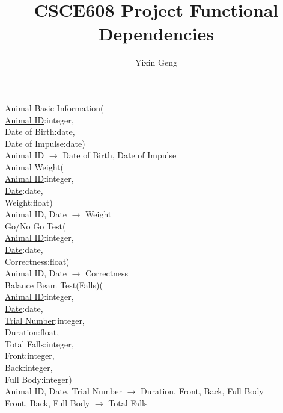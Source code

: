 \documentclass[12pt]{article}
\title{CSCE608 Project Functional Dependencies}
\author{Yixin Geng}
\date{}
\begin{document}
	\maketitle
	Animal Basic Information(\\
	\indent\indent \underline{Animal ID}:integer,\\
	\indent\indent Date of Birth:date,\\
	\indent\indent Date of Impulse:date)\\
	\indent Animal ID $\rightarrow$ Date of Birth, Date of Impulse\\
	
	\indent Animal Weight(\\
	\indent\indent \underline{Animal ID}:integer,\\
	\indent\indent \underline{Date}:date,\\
	\indent\indent Weight:float)\\
	\indent Animal ID, Date $\rightarrow$ Weight\\ 
		
	\indent Go/No Go Test(\\
	\indent\indent \underline{Animal ID}:integer,\\
	\indent\indent \underline{Date}:date,\\
	\indent\indent Correctness:float)\\
	\indent Animal ID, Date $\rightarrow$ Correctness\\ 
	
	\indent Balance Beam Test(Falls)(\\
	\indent\indent \underline{Animal ID}:integer,\\
	\indent\indent \underline{Date}:date,\\
	\indent\indent \underline{Trial Number}:integer,\\
	\indent\indent Duration:float,\\
	\indent\indent Total Falls:integer,\\
	\indent\indent Front:integer,\\
	\indent\indent Back:integer,\\
	\indent\indent Full Body:integer)\\
	\indent Animal ID, Date, Trial Number $\rightarrow$ Duration, Front, Back, Full Body\\
	\indent Front, Back, Full Body $\rightarrow$ Total Falls\\
		
\end{document}
